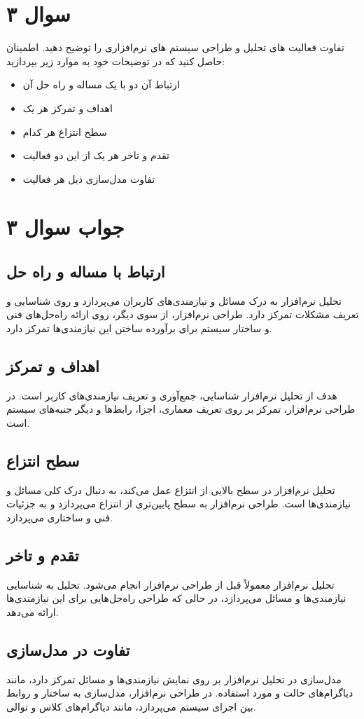 \section*{سوال ۳}

تفاوت فعالیت های تحلیل و طراحی سیستم های نرم‌افزاری را توضیح دهید. اطمینان حاصل کنید که در توضیحات خود به موارد زیر بپردازید:

\begin{itemize}
	\item ارتباط آن دو با یک مساله و راه حل آن
	\item اهداف و تمرکز هر یک
	\item سطح انتزاع هر کدام
	\item تقدم و تاخر هر یک از این دو فعالیت
	\item تفاوت مدل‌سازی ذیل هر فعالیت
\end{itemize}

\section*{جواب سوال ۳}

\subsection*{ارتباط با مساله و راه حل}
تحلیل نرم‌افزار به درک مسائل و نیازمندی‌های کاربران می‌پردازد و روی شناسایی و تعریف مشکلات تمرکز دارد. طراحی نرم‌افزار، از سوی دیگر، روی ارائه راه‌حل‌های فنی و ساختار سیستم برای برآورده ساختن این نیازمندی‌ها تمرکز دارد.

\subsection*{اهداف و تمرکز}
هدف از تحلیل نرم‌افزار شناسایی، جمع‌آوری و تعریف نیازمندی‌های کاربر است. در طراحی نرم‌افزار، تمرکز بر روی تعریف معماری، اجزا، رابط‌ها و دیگر جنبه‌های سیستم است.

\subsection*{سطح انتزاع}
تحلیل نرم‌افزار در سطح بالایی از انتزاع عمل می‌کند، به دنبال درک کلی مسائل و نیازمندی‌ها است. طراحی نرم‌افزار به سطح پایین‌تری از انتزاع می‌پردازد و به جزئیات فنی و ساختاری می‌پردازد.

\subsection*{تقدم و تاخر}
تحلیل نرم‌افزار معمولاً قبل از طراحی نرم‌افزار انجام می‌شود. تحلیل به شناسایی نیازمندی‌ها و مسائل می‌پردازد، در حالی که طراحی راه‌حل‌هایی برای این نیازمندی‌ها ارائه می‌دهد.

\subsection*{تفاوت در مدل‌سازی}
مدل‌سازی در تحلیل نرم‌افزار بر روی نمایش نیازمندی‌ها و مسائل تمرکز دارد، مانند دیاگرام‌های حالت و مورد استفاده. در طراحی نرم‌افزار، مدل‌سازی به ساختار و روابط بین اجزای سیستم می‌پردازد، مانند دیاگرام‌های کلاس و توالی.